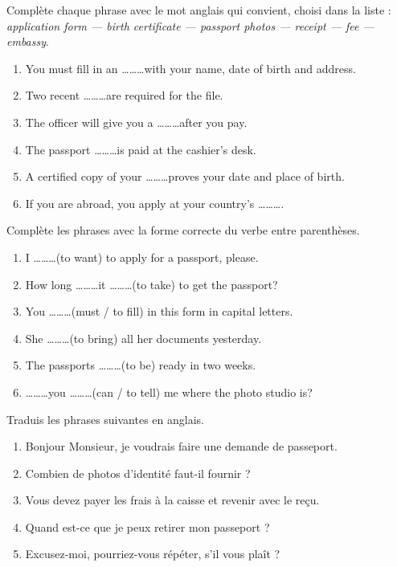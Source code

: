 \documentclass[11pt]{article}
\newcounter{popsec}
\newcounter{popsub}
\newcommand{\courssub}[1]{%
  \stepcounter{popsub}%
  \par\vspace{9pt}\noindent{\popxbold\fontsize{11.5}{13}\selectfont\color{popink}{\color{poporange}\thepopsec.\thepopsub}\hspace{6pt}#1}\par\nopagebreak\vspace{4pt}
}
\begin{document}
\begin{exercice}
Complète chaque phrase avec le mot anglais qui convient, choisi dans la liste : \emph{application form — birth certificate — passport photos — receipt — fee — embassy}.
\begin{enumerate}
\item You must fill in an \ldots\ldots\ldots with your name, date of birth and address.
\item Two recent \ldots\ldots\ldots are required for the file.
\item The officer will give you a \ldots\ldots\ldots after you pay.
\item The passport \ldots\ldots\ldots is paid at the cashier's desk.
\item A certified copy of your \ldots\ldots\ldots proves your date and place of birth.
\item If you are abroad, you apply at your country's \ldots\ldots\ldots.
\end{enumerate}
\end{exercice}

\begin{exercice}
Complète les phrases avec la forme correcte du verbe entre parenthèses.
\begin{enumerate}
\item I \ldots\ldots\ldots (to want) to apply for a passport, please.
\item How long \ldots\ldots\ldots it \ldots\ldots\ldots (to take) to get the passport?
\item You \ldots\ldots\ldots (must / to fill) in this form in capital letters.
\item She \ldots\ldots\ldots (to bring) all her documents yesterday.
\item The passports \ldots\ldots\ldots (to be) ready in two weeks.
\item \ldots\ldots\ldots you \ldots\ldots\ldots (can / to tell) me where the photo studio is?
\end{enumerate}
\end{exercice}

\courssub{Je m'entraîne}

\begin{exercice}
Traduis les phrases suivantes en anglais.
\begin{enumerate}
\item Bonjour Monsieur, je voudrais faire une demande de passeport.
\item Combien de photos d'identité faut-il fournir ?
\item Vous devez payer les frais à la caisse et revenir avec le reçu.
\item Quand est-ce que je peux retirer mon passeport ?
\item Excusez-moi, pourriez-vous répéter, s'il vous plaît ?
\end{enumerate}
\end{exercice}
\end{document}
